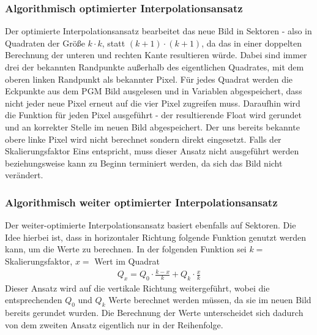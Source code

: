 \documentclass[course=erap]{aspdoc}
\begin{document}
\subsubsection{Algorithmisch optimierter Interpolationsansatz}
Der optimierte Interpolationsansatz bearbeitet das neue Bild in Sektoren - also in Quadraten der Größe $k \cdot k$, statt $(k+1) \cdot (k+1)$, da das in einer doppelten Berechnung der unteren und rechten Kante resultieren würde. Dabei sind immer drei der bekannten Randpunkte außerhalb des eigentlichen Quadrates, mit dem oberen linken Randpunkt als bekannter Pixel. Für jedes Quadrat werden die Eckpunkte aus dem PGM Bild ausgelesen und in Variablen abgespeichert, dass nicht jeder neue Pixel erneut auf die vier Pixel zugreifen muss. Daraufhin wird die Funktion für jeden Pixel ausgeführt - der resultierende Float wird gerundet und an korrekter Stelle im neuen Bild abgespeichert. Der uns bereits bekannte obere linke Pixel wird nicht berechnet sondern direkt eingesetzt. Falls der Skalierungsfaktor Eins entspricht, muss dieser Ansatz nicht ausgeführt werden beziehungsweise kann zu Beginn terminiert werden, da sich das Bild nicht verändert.

\subsubsection{Algorithmisch weiter optimierter Interpolationsansatz}
Der weiter-optimierte Interpolationsansatz basiert ebenfalls auf Sektoren. Die Idee hierbei ist, dass in horizontaler Richtung folgende Funktion genutzt werden kann, um die Werte zu berechnen. In der folgenden Funktion sei $k =$ Skalierungsfaktor, $x =$ Wert im Quadrat
\begin{align}
    Q_{x} {=} Q_{0} \cdot \frac{k-x}{k} + Q_{k} \cdot \frac{x}{k}
\end{align}
Dieser Ansatz wird auf die vertikale Richtung weitergeführt, wobei die entsprechenden $Q_{0}$ und $Q_{k}$ Werte berechnet werden müssen, da sie im neuen Bild bereits gerundet wurden. Die Berechnung der Werte unterscheidet sich dadurch von dem zweiten Ansatz eigentlich nur in der Reihenfolge.
\end{document}
